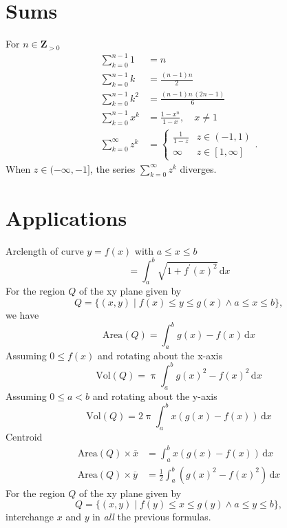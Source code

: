\documentclass[letterpaper,landscape,9pt,fleqn]{extarticle}
\begin{document}
\begin{multicols*}{4}
\section*{Sums}
\begin{minipage}{0.25\textwidth}
For \(n\in \mathbf{Z}_{>0}\) 
\begin{align*}
    \sum_{k=0}^{n-1}1 &= n \\
     \sum_{k=0}^{n-1}{\left. k\right.} &=\frac{\left( n-1\right)  n}{2}\\
    \sum_{k=0}^{n-1}{\left. {{k}^{2}}\right.} &=\frac{\left( n-1\right)  n\, \left( 2 n-1\right) }{6}\\
    \sum_{k=0}^{n-1} x^k &= \frac{1-x^n}{1-x}, \quad  x \neq 1 \\
    \sum_{k=0}^\infty z^k &= \begin{cases} \frac{1}{1-z} & z \in (-1,1) \\
                                      \infty & z \in [1,\infty] 
\end{cases}.
   \end{align*}
   When $z \in (-\infty, -1]$, the series $\sum_{k=0}^\infty z^k$ diverges.
 \end{minipage}
 \vspace{0.25in}
 \section*{Applications}
Arclength of curve \(y = f(x)\) with \(a \leq x \leq b\)
\[
   = \int_a^b \sqrt{1 + f^\prime(x)^2} \, \mathrm{d} x
\]
For the region \(Q\) of the xy plane given by
\[
   Q = \{(x,y) \mid f(x) \leq y \leq g(x) \land a \leq x \leq b \},
\]
we have
\[
  \mbox{Area}(Q) = \int_a^b g(x) - f(x) \, \mathrm{d} x
\]  
Assuming \(0 \leq f(x)\) and rotating about the \mbox{x-axis}
\[
  \mbox{Vol}(Q) = \uppi \int_a^b g(x)^2 - f(x)^2 \, \mathrm{d} x
\]
Assuming \(0 \leq a < b\) and rotating about the y-axis
\[
  \mbox{Vol}(Q) = 2 \uppi \int_a^b x (g(x)  - f(x)) \, \mathrm{d} x
\]
Centroid
\begin{align*}
    \mbox{Area}(Q) \times \overline{x} &=  \int_a^b x \left(g(x) - f(x) \right) \, \mathrm{d} x \\
     \mbox{Area}(Q) \times \overline{y} &=  \frac{1}{2} \int_a^b  \left (g(x)^2  - f(x)^2 \right) \, \mathrm{d} x
\end{align*}
For the region \(Q\) of the xy plane given by
\[
   Q = \{(x,y) \mid f(y) \leq x \leq g(y) \land a \leq y \leq b \},
\]
interchange \(x\) and \(y\) in \emph{all} the previous formulas. 




\end{multicols*}
\end{document}
